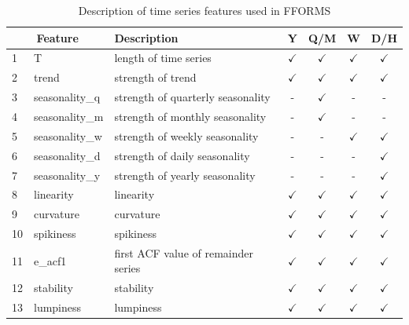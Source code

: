 \documentclass[11pt,a4paper,]{article}
\def\yes{$\checkmark$}
\begin{document}
\begin{table}[!htp]
\centering\footnotesize\tabcolsep=0.12cm
\caption{Description of time series features used in FFORMS}
\label{feature}
\begin{tabular}{llp{}cccc}
\toprule
\multicolumn{2}{c}{Feature} & Description & Y & Q/M & W & D/H\\
\midrule
1  & T              & length of time series                                                                   & \yes  & \yes & \yes & \yes\\
2  & trend          & strength of trend                                                                       & \yes  & \yes & \yes & \yes\\
3  & seasonality\_q    & strength of quarterly seasonality                                                    & -     & \yes & - & -\\
4  & seasonality\_m    & strength of monthly seasonality                                                      & -     & \yes & - & -\\
5  & seasonality\_w    & strength of weekly seasonality                                                       & -     & - & \yes & \yes \\
6  & seasonality\_d    & strength of daily seasonality                                                        & -     & - & - & \yes\\
7  & seasonality\_y    & strength of yearly seasonality                                                       & -     & - & - & \yes\\
8  & linearity      & linearity                                                                               & \yes  & \yes & \yes & \yes\\
9  & curvature      & curvature                                                                               & \yes  & \yes & \yes & \yes\\
10  & spikiness      & spikiness                                                                               & \yes  & \yes & \yes & \yes\\
11  & e\_acf1        & first ACF value of remainder series                                                     & \yes  & \yes & \yes & \yes\\
12  & stability      & stability                                                                               & \yes  & \yes & \yes & \yes\\
13  & lumpiness      & lumpiness                                                                               & \yes  & \yes & \yes & \yes\\

\end{tabular}
\end{table}
\end{document}
